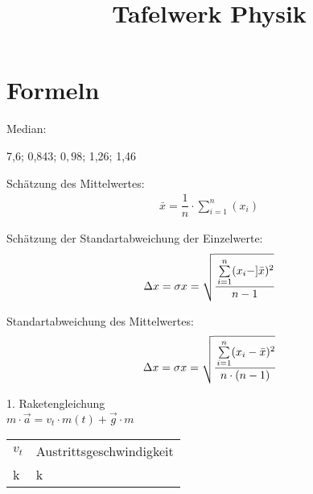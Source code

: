 \documentclass[a4paper,12pt]{scrartcl}
\begin{document}
\title{Tafelwerk Physik}
\maketitle
\section{Formeln}

Median: 
\begin{center}
7,6; 0,843; $\boxed{0,98}$; 1,26; 1,46
\end{center} 

Schätzung des Mittelwertes: \\
\begin{align*}
\bar{x} = \dfrac{1}{n} \cdot \sum\limits_{i=1}^n (x_i)
\end{align*} 

Schätzung der Standartabweichung der Einzelwerte: \\
\begin{align*}
\Delta x = \sigma x = \sqrt{ \cfrac{\sum \limits_{i=1}^n (x_i - ]\bar{x})^2}{n-1}}
\end{align*}

Standartabweichung des Mittelwertes: \\
\begin{align*}
\Delta x = \sigma x = \sqrt{ \cfrac{\sum \limits_{i=1}^n (x_i - \bar{x})^2}{n \cdot (n-1)}}
\end{align*}

1. Raketengleichung\\
$m \cdot \overrightarrow{a} = v_t \cdot m(t)+\overrightarrow{g} \cdot m$

\begin{tabular}{ll}
$v_t$ & Austrittsgeschwindigkeit\\
k & k\\
\end{tabular}
\end{document}
